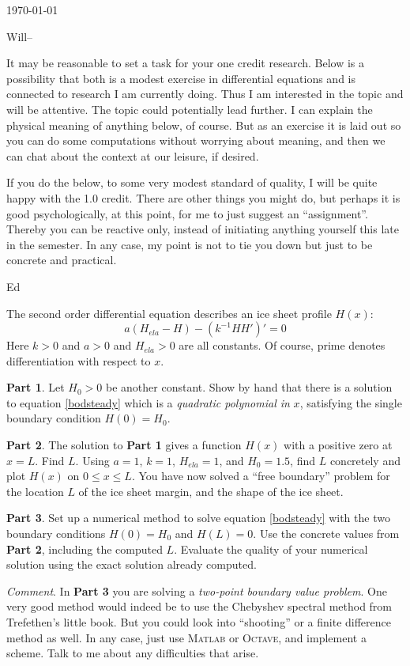 \documentclass[12pt]{amsart}
\begin{document}
\scriptsize \hfill \today
\thispagestyle{empty}

\normalsize
\bigskip

\noindent Will--
\medskip

It may be reasonable to set a task for your one credit research.  Below is a possibility that both is a modest exercise in differential equations and is connected to research I am currently doing.  Thus I am interested in the topic and will be attentive.  The topic could potentially lead further.  I can explain the physical meaning of anything below, of course.  But as an exercise it is laid out so you can do some computations without worrying about meaning, and then we can chat about the context at our leisure, if desired.

If you do the below, to some very modest standard of quality, I will be quite happy with the 1.0 credit.  There are other things you might do, but perhaps it is good psychologically, at this point, for me to just suggest an ``assignment''.  Thereby you can be reactive only, instead of initiating anything yourself this late in the semester.  In any case, my point is not to tie you down but just to be concrete and practical.
\medskip

\noindent Ed

\bigskip\bigskip\bigskip

The second order differential equation describes an ice sheet profile $H(x)$:
\begin{equation}
a (H_{ela} - H) - (k^{-1} H H')' = 0  \label{bodsteady}
\end{equation}
Here $k>0$ and $a>0$ and $H_{ela}>0$ are all constants.  Of course, prime denotes differentiation with respect to $x$.

\noindent \textbf{Part 1}. \quad  Let $H_0>0$ be another constant.  Show by hand that there is a solution to equation \eqref{bodsteady} which is a \emph{quadratic polynomial in} $x$, satisfying the single boundary condition $H(0)=H_0$.

\noindent \textbf{Part 2}. \quad  The solution to \textbf{Part 1} gives a function $H(x)$ with a positive zero at $x=L$.  Find $L$.   Using $a=1$, $k=1$, $H_{ela}=1$, and $H_0=1.5$, find $L$ concretely and plot $H(x)$ on $0\le x \le L$.  You have now solved a ``free boundary'' problem for the location $L$ of the ice sheet margin, and the shape of the ice sheet.

\noindent \textbf{Part 3}. \quad  Set up a numerical method to solve equation \eqref{bodsteady} with the two boundary conditions $H(0)=H_0$ and $H(L)=0$.  Use the concrete values from \textbf{Part 2}, including the computed $L$.  Evaluate the quality of your numerical solution using the exact solution already computed.

\bigskip
\emph{Comment}.  In \textbf{Part 3} you are solving a \emph{two-point boundary value problem}.  One very good method would indeed be to use the Chebyshev spectral method from Trefethen's little book.  But you could look into ``shooting'' or a finite difference method as well.  In any case, just use \textsc{Matlab} or \textsc{Octave}, and implement a scheme.  Talk to me about any difficulties that arise.


%
%
\end{document}
